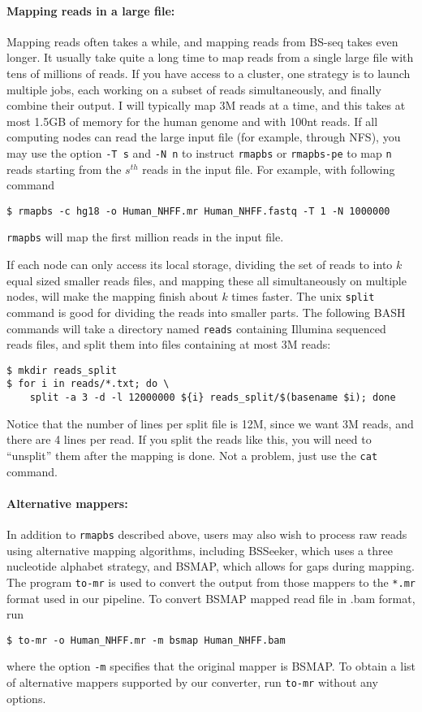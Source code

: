 \documentclass[10pt]{article}
\newcommand{\prog}[1]{\texttt{#1}}
\newcommand{\fn}[1]{\texttt{#1}}
\newcommand{\op}[1]{\texttt{#1}}
\begin{document}
\paragraph{Mapping reads in a large file:} 
Mapping reads often takes a while, and mapping reads from BS-seq takes
even longer. It usually take quite a long time to map reads from a
single large file with tens of millions of reads. If you have access
to a cluster, one strategy is to launch multiple jobs, each working on
a subset of reads simultaneously, and finally combine their output. I
will typically map 3M reads at a time, and this takes at most 1.5GB of
memory for the human genome and with 100nt reads. If all computing
nodes can read the large input file (for example, through NFS), you
may use the option \op{-T s} and \op{-N n} to instruct \prog{rmapbs}
or \prog{rmapbs-pe} to map \op{n} reads starting from the $s^{th}$
reads in the input file. For example, with following command
\begin{verbatim}
$ rmapbs -c hg18 -o Human_NHFF.mr Human_NHFF.fastq -T 1 -N 1000000
\end{verbatim}
\prog{rmapbs} will map the first million reads in the input file.   
  
If each node can only access its local storage, dividing the set of
reads to into $k$ equal sized smaller reads files, and mapping these
all simultaneously on multiple nodes, will make the mapping finish
about $k$ times faster.  The unix \prog{split} command is good for
dividing the reads into smaller parts. The following BASH commands
will take a directory named \fn{reads} containing Illumina sequenced
reads files, and split them into files containing at most 3M reads:
\begin{verbatim}
$ mkdir reads_split
$ for i in reads/*.txt; do \
    split -a 3 -d -l 12000000 ${i} reads_split/$(basename $i); done
\end{verbatim}
Notice that the number of lines per split file is 12M, since we want
3M reads, and there are 4 lines per read. If you split the reads like
this, you will need to ``unsplit'' them after the mapping is done. Not
a problem, just use the \prog{cat} command.

\paragraph{Alternative mappers:}
\label{sec:alternative-mappers}
In addition to \prog{rmapbs} described above, users may also wish
to process raw reads using alternative mapping algorithms, including
BSSeeker, which uses a three nucleotide alphabet strategy, and BSMAP,
which allows for gaps during mapping. The program \prog{to-mr} is used
to convert the output from those mappers to the \fn{*.mr} format used in
our pipeline. To convert BSMAP mapped read file in .bam format, run
\begin{verbatim}
$ to-mr -o Human_NHFF.mr -m bsmap Human_NHFF.bam
\end{verbatim}
where the option \op{-m} specifies that the original mapper is
BSMAP. To obtain a list of alternative mappers supported by our
converter, run \prog{to-mr} without any options. 
\end{document}
